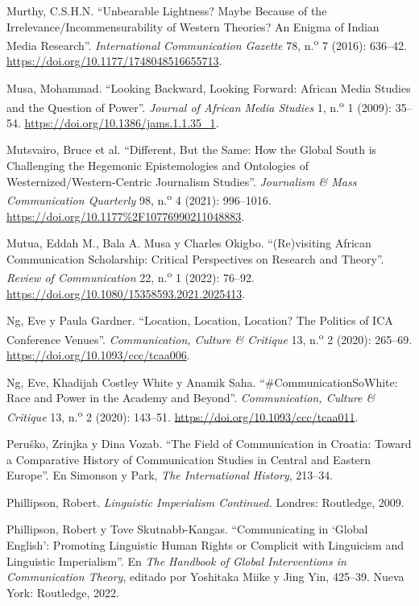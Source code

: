 \documentclass{tufte-handout}
\begin{document}
\begin{hangparas}{.25in}{1}
Murthy, C.S.H.N. ``Unbearable Lightness? Maybe Because of the
Irrelevance/Incommensurability of Western Theories? An Enigma of Indian
Media Research''. \emph{International Communication Gazette} 78,
n.\textsuperscript{o} 7 (2016): 636--42.
\url{https://doi.org/10.1177/1748048516655713}.

Musa, Mohammad. ``Looking Backward, Looking Forward: African Media
Studies and the Question of Power''. \emph{Journal of African Media
Studies} 1, n.\textsuperscript{o} 1 (2009): 35--54.
\url{https://doi.org/10.1386/jams.1.1.35_1}.

Mutsvairo, Bruce et al. ``Different, But the Same: How the Global South
is Challenging the Hegemonic Epistemologies and Ontologies of
Westernized/Western-Centric Journalism Studies''. \emph{Journalism \&
Mass Communication Quarterly} 98, n.\textsuperscript{o} 4 (2021):
996--1016. \url{https://doi.org/10.1177\%2F10776990211048883}.

Mutua, Eddah M., Bala A. Musa y Charles Okigbo. ``(Re)visiting African
Communication Scholarship: Critical Perspectives on Research and
Theory''. \emph{Review of Communication} 22, n.\textsuperscript{o} 1
(2022): 76--92. \url{https://doi.org/10.1080/15358593.2021.2025413}.

Ng, Eve y Paula Gardner. ``Location, Location, Location? The Politics of
ICA Conference Venues''. \emph{Communication, Culture \& Critique} 13,
n.\textsuperscript{o} 2 (2020): 265--69.
\url{https://doi.org/10.1093/ccc/tcaa006}.

Ng, Eve, Khadijah Costley White y Anamik Saha. ``\#CommunicationSoWhite:
Race and Power in the Academy and Beyond''. \emph{Communication, Culture
\& Critique} 13, n.\textsuperscript{o} 2 (2020): 143--51.
\url{https://doi.org/10.1093/ccc/tcaa011}.

Peruško, Zrinjka y Dina Vozab. ``The Field of Communication in Croatia:
Toward a Comparative History of Communication Studies in Central and
Eastern Europe''. En Simonson y Park, \emph{The International History},
213--34.

Phillipson, Robert. \emph{Linguistic Imperialism Continued.} Londres:
Routledge, 2009.

Phillipson, Robert y Tove Skutnabb-Kangas. ``Communicating in `Global
English': Promoting Linguistic Human Rights or Complicit with Linguicism
and Linguistic Imperialism''. En \emph{The Handbook of Global
Interventions in Communication Theory}, editado por Yoshitaka Miike y
Jing Yin, 425--39. Nueva York: Routledge, 2022.


\end{hangparas}
\end{document}
